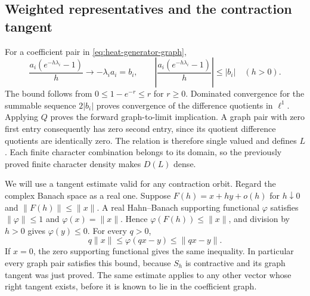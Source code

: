 \documentclass[11pt]{article}
\theoremstyle{remark}\newtheorem{remark}[theorem]{Remark}
\begin{document}
\subsection{Weighted representatives and the contraction tangent}
For a coefficient pair in \eqref{eq:heat-generator-graph},
\[
 \frac{a_i(e^{-h\lambda_i}-1)}h\longrightarrow-\lambda_i a_i=b_i,
 \qquad
 \left|\frac{a_i(e^{-h\lambda_i}-1)}h\right|\leq|b_i|\quad(h>0).
\]
The bound follows from $0\leq1-e^{-r}\leq r$ for $r\geq0$.
Dominated convergence for the summable sequence $2|b_i|$ proves
convergence of the difference quotients in $\ell^1$. Applying $Q$
proves the forward graph-to-limit implication. A graph pair with
zero first entry consequently has zero second entry, since its
quotient difference quotients are identically zero. The relation is
therefore single valued and defines $L$. Each finite character
combination belongs to its domain, so the previously proved finite
character density makes $D(L)$ dense.

We will use a tangent estimate valid for any contraction orbit.
Regard the complex Banach space as a real one. Suppose
$F(h)=x+hy+o(h)$ for $h\downarrow0$ and $\|F(h)\|\leq\|x\|$.
A real Hahn--Banach supporting functional $\varphi$ satisfies
$\|\varphi\|\leq1$ and $\varphi(x)=\|x\|$. Hence
$\varphi(F(h))\leq\|x\|$, and division by $h>0$ gives
$\varphi(y)\leq0$. For every $q>0$,
\begin{equation}\label{eq:heat-dissipative}
 q\|x\|\leq\varphi(qx-y)\leq\|qx-y\|.
\end{equation}
If $x=0$, the zero supporting functional gives the same inequality.
In particular every graph pair satisfies this bound, because $S_h$
is contractive and its graph tangent was just proved. The same
estimate applies to any other vector whose right tangent exists,
before it is known to lie in the coefficient graph.
\end{document}
